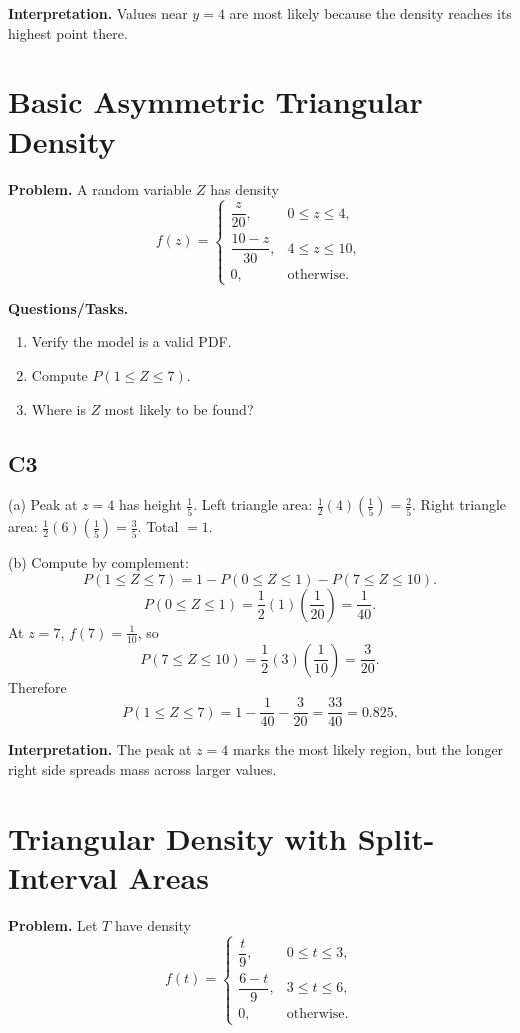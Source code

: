 \textbf{Interpretation.}
Values near $y=4$ are most likely because the density reaches its highest point there.

\section{Basic Asymmetric Triangular Density}

\textbf{Problem.}
A random variable $Z$ has density
\[
f(z)=\begin{cases}
\dfrac{z}{20}, & 0\le z\le 4,\\
\dfrac{10-z}{30}, & 4\le z\le 10,\\
0, & \text{otherwise.}
\end{cases}
\]

\textbf{Questions/Tasks.}
\begin{enumerate}[label=(\alph*)]
\item Verify the model is a valid PDF.
\item Compute $P(1\le Z\le 7)$.
\item Where is $Z$ most likely to be found?
\end{enumerate}

\subsection*{C3}
(a) Peak at $z=4$ has height $\frac15$.
Left triangle area: $\frac12(4)(\frac15)=\frac25$.
Right triangle area: $\frac12(6)(\frac15)=\frac35$.
Total $=1$.

(b) Compute by complement:
\[
P(1\le Z\le 7)=1-P(0\le Z\le 1)-P(7\le Z\le 10).
\]
\[
P(0\le Z\le 1)=\frac12(1)\left(\frac1{20}\right)=\frac1{40}.
\]
At $z=7$, $f(7)=\frac{1}{10}$, so
\[
P(7\le Z\le 10)=\frac12(3)\left(\frac{1}{10}\right)=\frac{3}{20}.
\]
Therefore
\[
P(1\le Z\le 7)=1-\frac1{40}-\frac3{20}=\frac{33}{40}=0.825.
\]

\textbf{Interpretation.}
The peak at $z=4$ marks the most likely region, but the longer right side spreads mass across larger values.

\section{Triangular Density with Split-Interval Areas}

\textbf{Problem.}
Let $T$ have density
\[
f(t)=\begin{cases}
\dfrac{t}{9}, & 0\le t\le 3,\\
\dfrac{6-t}{9}, & 3\le t\le 6,\\
0, & \text{otherwise.}
\end{cases}
\]

